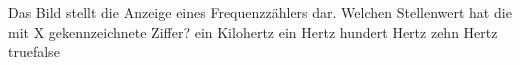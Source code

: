     {Das Bild stellt die Anzeige eines Frequenzzählers dar. Welchen Stellenwert hat die mit X gekennzeichnete Ziffer?}
    {ein Kilohertz}
    {ein Hertz}
    {hundert Hertz}
    {zehn Hertz}
    {true}{false}